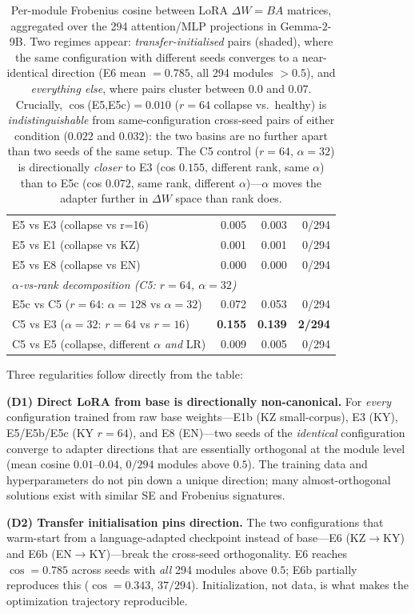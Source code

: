 \documentclass[11pt]{article}
\begin{document}
\begin{table}[t]
\begin{tabular}{lrrr}
E5 vs E3 (collapse vs r=16)& 0.005 & 0.003 & 0/294\\
E5 vs E1 (collapse vs KZ)  & 0.001 & 0.001 & 0/294\\
E5 vs E8 (collapse vs EN)  & 0.000 & 0.000 & 0/294\\
\midrule
\multicolumn{4}{l}{\emph{$\alpha$-vs-rank decomposition (C5: $r{=}64$, $\alpha{=}32$)}}\\
E5c vs C5 ($r{=}64$: $\alpha{=}128$ vs $\alpha{=}32$) & 0.072 & 0.053 & 0/294\\
C5 vs E3 ($\alpha{=}32$: $r{=}64$ vs $r{=}16$) & \textbf{0.155} & \textbf{0.139} & \textbf{2/294}\\
C5 vs E5 (collapse, different $\alpha$ \emph{and} LR) & 0.009 & 0.005 & 0/294\\
\bottomrule
\end{tabular}
\caption{Per-module Frobenius cosine between LoRA $\Delta W{=}BA$ matrices, aggregated over the 294 attention/MLP projections in Gemma-2-9B. Two regimes appear: \emph{transfer-initialised} pairs (shaded), where the same configuration with different seeds converges to a near-identical direction (E6 mean $=0.785$, all 294 modules $>0.5$), and \emph{everything else}, where pairs cluster between $0.0$ and $0.07$. Crucially, $\cos$(E5,E5c)$=0.010$ ($r{=}64$ collapse vs.\ healthy) is \emph{indistinguishable} from same-configuration cross-seed pairs of either condition ($0.022$ and $0.032$): the two basins are no further apart than two seeds of the same setup. The C5 control ($r{=}64$, $\alpha{=}32$) is directionally \emph{closer} to E3 (cos $0.155$, different rank, same $\alpha$) than to E5c (cos $0.072$, same rank, different $\alpha$)---$\alpha$ moves the adapter further in $\Delta W$ space than rank does.}
\label{tab:pairwise_cos}
\end{table}

Three regularities follow directly from the table:

\textbf{(D1) Direct LoRA from base is directionally non-canonical.} For \emph{every} configuration trained from raw base weights---E1b (KZ small-corpus), E3 (KY), E5/E5b/E5c (KY $r{=}64$), and E8 (EN)---two seeds of the \emph{identical} configuration converge to adapter directions that are essentially orthogonal at the module level (mean cosine $0.01$--$0.04$, $0/294$ modules above $0.5$). The training data and hyperparameters do not pin down a unique direction; many almost-orthogonal solutions exist with similar SE and Frobenius signatures.

\textbf{(D2) Transfer initialisation pins direction.} The two configurations that warm-start from a language-adapted checkpoint instead of base---E6 (KZ$\rightarrow$KY) and E6b (EN$\rightarrow$KY)---break the cross-seed orthogonality. E6 reaches $\cos=0.785$ across seeds with \emph{all} 294 modules above $0.5$; E6b partially reproduces this ($\cos=0.343$, $37/294$). Initialization, not data, is what makes the optimization trajectory reproducible.
\end{document}
